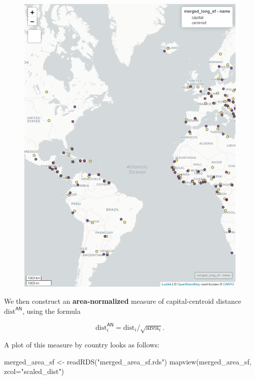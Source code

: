 \documentclass[
  letterpaper,
  DIV=11,
  numbers=noendperiod]{scrartcl}
\newenvironment{Shaded}{\begin{snugshade}}{\end{snugshade}}
\newcommand{\AttributeTok}[1]{\textcolor[rgb]{0.40,0.45,0.13}{#1}}
\newcommand{\FunctionTok}[1]{\textcolor[rgb]{0.28,0.35,0.67}{#1}}
\newcommand{\NormalTok}[1]{\textcolor[rgb]{0.00,0.23,0.31}{#1}}
\newcommand{\OtherTok}[1]{\textcolor[rgb]{0.00,0.23,0.31}{#1}}
\newcommand{\StringTok}[1]{\textcolor[rgb]{0.13,0.47,0.30}{#1}}
\begin{document}
\begin{figure}[H]

{\centering \includegraphics{index_files/figure-pdf/load-eda-1.pdf}

}

\end{figure}

We then construct an \textbf{area-normalized} measure of
capital-centroid distance \(\text{dist}^{\textsf{AN}}\), using the
formula

\[
\text{dist}^{\textsf{AN}}_i = \text{dist}_i / \sqrt{\text{area}_i}.
\]

A plot of this measure by country looks as follows:

\begin{Shaded}
\begin{Highlighting}[]
\NormalTok{merged\_area\_sf }\OtherTok{\textless{}{-}} \FunctionTok{readRDS}\NormalTok{(}\StringTok{"merged\_area\_sf.rds"}\NormalTok{)}
\FunctionTok{mapview}\NormalTok{(merged\_area\_sf, }\AttributeTok{zcol=}\StringTok{"scaled\_dist"}\NormalTok{)}
\end{Highlighting}
\end{Shaded}
\end{document}
